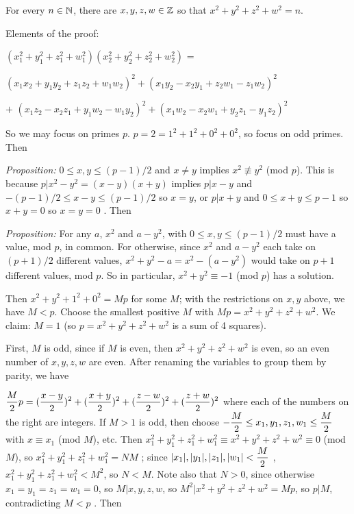 \msk

For every $n\in{\Bbb N}$, there are $x,y,z,w\in{\Bbb Z}$ so that $x^2+y^2+z^2+w^2=n$.

\ssk

Elements of the proof:

\ssk

$(x_1^2+y_1^2+z_1^2+w_1^2)(x_2^2+y_2^2+z_2^2+w_2^2)$ = 

\hhsk $(x_1x_2+y_1y_2+z_1z_2+w_1w_2)^2+(x_1y_2-x_2y_1+z_2w_1-z_1w_2)^2$ 

\hhsk \hhsk $+$ $(x_1z_2-x_2z_1+y_1w_2-w_1y_2)^2+(x_1w_2-x_2w_1+y_2z_1-y_1z_2)^2$

\ssk

So we may focus on primes $p$. $p=2 = 1^2+1^2+0^2+0^2$, so focus on odd primes. Then

\ssk

{\it Proposition:} $0\leq x,y\leq (p-1)/2$ and $x\neq y$ implies $x^2\not\equiv y^2$ (mod $p$). 
This is because
$p|x^2-y^2 = (x-y)(x+y)$ implies $p|x-y$ and $-(p-1)/2\leq x-y\leq (p-1)/2$  so $x=y$, 
or $p|x+y$ and $0\leq x+y\leq p-1$ so $x+y=0$ so $x=y=0$ . Then

\ssk

{\it Proposition:} For any
$a$, $x^2$ and $a-y^2$, with $0\leq x,y\leq (p-1)/2$ must have a value, mod $p$, 
in common. For otherwise, since $x^2$ and $a-y^2$ each take on 
$(p+1)/2$ different values, $x^2+y^2-a=x^2-(a-y^2)$ would take on $p+1$ different values, 
mod $p$. So in particular, $x^2+y^2\equiv -1$ (mod $p$) has a solution. 

\ssk

Then
$x^2+y^2+1^2+0^2=Mp$ for some $M$; with the restrictions on $x,y$ above, we have $M<p$.
Choose the smallest positive $M$ with $Mp=x^2+y^2+z^2+w^2$. We claim: $M=1$ (so
$p=x^2+y^2+z^2+w^2$ is a sum of 4 squares). 

\ssk

First, $M$ is odd, since if $M$ is even, then $x^2+y^2+z^2+w^2$ is even, so
an even number of $x,y,z,w$ are even.
After renaming the variables to group them by parity, we have

\ssk

$\displaystyle{{M}\over{2}}p = ({{x-y}\over{2}})^2+({{x+y}\over{2}})^2+({{z-w}\over{2}})^2+({{z+w}\over{2}})^2$
\hhsk where each of the numbers on the right are integers.
If $M>1$ is odd, then choose 
$\displaystyle -{{M}\over{2}}\leq x_1,y_1,z_1,w_1\leq{{M}\over{2}}$ with
$x\equiv x_1$ (mod $M$), etc. Then $x_1^2+y_1^2+z_1^2+w_1^2\equiv x^2+y^2+z^2+w^2\equiv 0$ (mod $M$), so 
$x_1^2+y_1^2+z_1^2+w_1^2=NM$ ; since $\displaystyle |x_1|,|y_1|,|z_1|,|w_1|<{{M}\over{2}}$ , 
$x_1^2+y_1^2+z_1^2+w_1^2<M^2$, so $N<M$. Note also that $N>0$, since otherwise $x_1=y_1=z_1=w_1=0$,
so $M|x,y,z,w$, so $M^2|x^2+y^2+z^2+w^2=Mp$, so $p|M$, contradicting $M<p$ . Then


